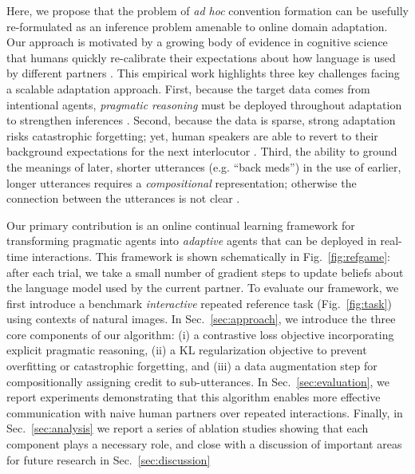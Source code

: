 \documentclass[11pt,a4paper]{article}
\newcommand{\sref}[1]{Sec.\ \ref{#1}}    %
\begin{document}
Here, we propose that the problem of \emph{ad hoc} convention formation can be usefully re-formulated as an inference problem amenable to online domain adaptation. 
Our approach is motivated by a growing body of evidence in cognitive science that humans quickly re-calibrate their expectations about how language is used by different partners \cite{grodner201110,Yildirim16_TalkerSpecificityQuantifiers}.
This empirical work highlights three key challenges facing a scalable adaptation approach.
First, because the target data comes from intentional agents, \emph{pragmatic reasoning} must be deployed throughout adaptation to strengthen inferences \cite{FrankGoodmanTenenbaum09_Wurwur}.
Second, because the data is sparse, strong adaptation risks catastrophic forgetting; yet, human speakers are able to revert to their background expectations for the next interlocutor \cite{WilkesGibbsClark92_CoordinatingBeliefs,MetzingBrennan03_PartnerSpecificPacts}. 
Third, the ability to ground the meanings of later, shorter utterances (e.g. ``back meds'') in the use of earlier, longer utterances requires a \emph{compositional} representation; otherwise the connection between the utterances is not clear \cite{hawkins2019characterizing}.

Our primary contribution is an online continual learning framework for transforming pragmatic agents into \emph{adaptive} agents that can be deployed in real-time interactions.
This framework is shown schematically in Fig.~\ref{fig:refgame}: after each trial, we take a small number of gradient steps to update beliefs about the language model used by the current partner.
To evaluate our framework, we first introduce a benchmark \emph{interactive} repeated reference task (Fig.~\ref{fig:task}) using contexts of natural images.
In \sref{sec:approach}, we introduce the three core components of our algorithm: (i) a contrastive loss objective incorporating explicit pragmatic reasoning, (ii) a KL regularization objective to prevent overfitting or catastrophic forgetting, and (iii) a data augmentation step for compositionally assigning credit to sub-utterances. 
In \sref{sec:evaluation}, we report experiments demonstrating that this algorithm enables more effective communication with naive human partners over repeated interactions.
Finally, in \sref{sec:analysis} we report a series of ablation studies showing that each component plays a necessary role, and close with a discussion of important areas for future research in \sref{sec:discussion}
\end{document}
